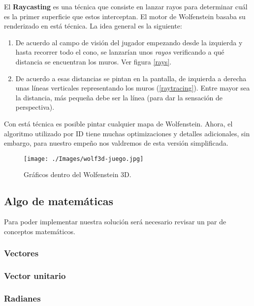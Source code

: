 El \textbf{Raycasting} es una técnica que consiste en lanzar rayos para determinar cuál es la primer superficie que estos interceptan. El motor de Wolfenstein basaba su renderizado en está técnica. La idea general es la siguiente:

\begin{enumerate}
	\item De acuerdo al campo de visión del jugador empezando desde la izquierda y hasta recorrer todo el cono, se lanzarían unos \emph{rayos} verificando a qué distancia se encuentran los muros. Ver figura \ref{rays}.
	
	\item De acuerdo a esas distancias se pintan en la pantalla, de izquierda a derecha unas líneas verticales representando los muros (\ref{raytracing}). Entre mayor sea la distancia, más pequeña debe ser la línea (para dar la sensación de perspectiva).
\end{enumerate}

Con está técnica es posible pintar cualquier mapa de Wolfenstein. Ahora, el algoritmo utilizado por ID tiene muchas optimizaciones y detalles adicionales, sin embargo, para nuestro empeño nos valdremos de esta versión simplificada.

\begin{figure}[h!]
	\centering
	\texttt{[image: ./Images/wolf3d-juego.jpg]}
	\caption{Gráficos dentro del Wolfenstein 3D.}
	\label{wolf3d-mapa}
\end{figure}

\newpage
\subsection{Algo de matemáticas}

Para poder implementar nuestra solución será necesario revisar un par de conceptos matemáticos.

\subsubsection{Vectores}



\subsubsection{Vector unitario}

\subsubsection{Radianes}


